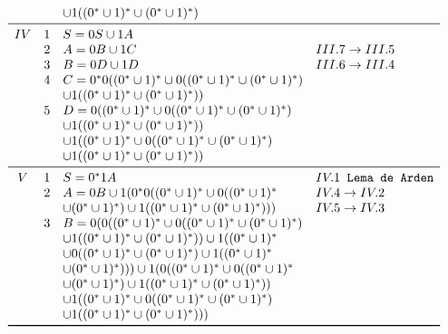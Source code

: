 \documentclass[12pt]{article}
\begin{document}
\begin{tcolorbox}[breakable,rounded corners, colback=yellow!5, colframe=red!40!black, title={Extração de expressão regular $\mathcal{R}_2$ da gramática $G_2$, tal que $\mathcal{L}(\mathcal{R}_2)=\mathcal{L}(G_2)$}]
$$\begin{array}{ccll}
      & &\cup 1((0^*\cup1)^* \cup (0^*\cup1)^*)&\\
  \midrule
   IV & 1 & S = 0S \cup 1A               &\\
      & 2 & A = 0B \cup 1C               &III.7 \to III.5\\
      & 3 & B = 0D \cup 1D               &III.6 \to III.4\\
      & 4 & C = 0^*0((0^*\cup1)^* \cup 0((0^*\cup1)^* \cup (0^*\cup1)^*)&\\ & & \cup 1((0^*\cup1)^* \cup (0^*\cup1)^*))               &\\
      & 5 & D = 0((0^*\cup1)^* \cup 0((0^*\cup1)^* \cup (0^*\cup1)^*) &\\
      & &\cup 1((0^*\cup1)^* \cup (0^*\cup1)^*)) &\\
      & &\cup 1((0^*\cup1)^* \cup 0((0^*\cup1)^* \cup (0^*\cup1)^*) &\\
      & &\cup 1((0^*\cup1)^* \cup (0^*\cup1)^*))               &\\
  \midrule
    V & 1 & S = 0^*1A               &IV.1\texttt{ Lema de Arden}\\
      & 2 & A = 0B \cup 1(0^*0((0^*\cup1)^* \cup 0((0^*\cup1)^* &IV.4 \to IV.2\\
      & &\cup (0^*\cup1)^*) \cup 1((0^*\cup1)^* \cup (0^*\cup1)^*)))               &IV.5 \to IV.3\\
      & 3 & B = 0(0((0^*\cup1)^* \cup 0((0^*\cup1)^* \cup (0^*\cup1)^*) &\\
      & &\cup 1((0^*\cup1)^* \cup (0^*\cup1)^*))\cup 1((0^*\cup1)^* &\\
      & & \cup 0((0^*\cup1)^* \cup (0^*\cup1)^*) \cup 1((0^*\cup1)^* &\\
      & & \cup (0^*\cup1)^*))) \cup 1(0((0^*\cup1)^* \cup 0((0^*\cup1)^* &\\
      & &\cup (0^*\cup1)^*)\cup 1((0^*\cup1)^* \cup (0^*\cup1)^*)) &\\
      & &\cup 1((0^*\cup1)^* \cup 0((0^*\cup1)^* \cup (0^*\cup1)^*) &\\
      & &\cup 1((0^*\cup1)^* \cup (0^*\cup1)^*)))              &\\
  \bottomrule
  \end{array}
  $$
\end{tcolorbox}
\end{document}
